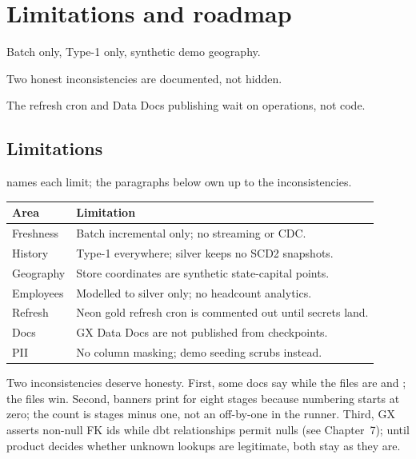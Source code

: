 \chapter{Limitations and roadmap}

\begin{glance}
\item Batch only, Type-1 only, synthetic demo geography.
\item Two honest inconsistencies are documented, not hidden.
\item The refresh cron and Data Docs publishing wait on operations, not code.
\end{glance}

\section{Limitations}

 names each limit; the paragraphs below own up to the inconsistencies.

\begin{center}
\begin{tabular}{>{\raggedright\arraybackslash}p{3.8cm} >{\raggedright\arraybackslash}p{10.0cm}}
\toprule
Area & Limitation \\
\midrule
Freshness & Batch incremental only; no streaming or CDC. \\
History & Type-1 everywhere; silver keeps no SCD2 snapshots. \\
Geography & Store coordinates are synthetic state-capital points. \\
Employees & Modelled to silver only; no headcount analytics. \\
Refresh & Neon gold refresh cron is commented out until secrets land. \\
Docs & GX Data Docs are not published from checkpoints. \\
PII & No column masking; demo seeding scrubs instead. \\
\bottomrule
\end{tabular}
\label{tab:limits}
\end{center}

Two inconsistencies deserve honesty. First, some docs say  while the files are  and ; the files win. Second, banners print  for eight stages because numbering starts at zero; the count is stages minus one, not an off-by-one in the runner. Third, GX asserts non-null FK ids while dbt relationships permit nulls (see Chapter~7); until product decides whether unknown lookups are legitimate, both stay as they are.

